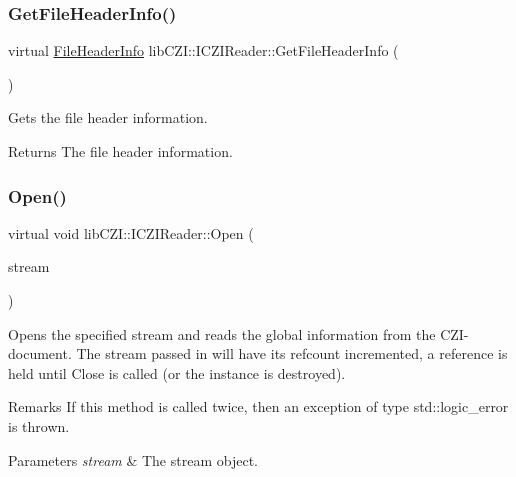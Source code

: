 \subsubsection{\texorpdfstring{Get\+File\+Header\+Info()}{GetFileHeaderInfo()}}
{\footnotesize\ttfamily virtual \hyperlink{structlib_c_z_i_1_1_file_header_info}{File\+Header\+Info} lib\+C\+Z\+I\+::\+I\+C\+Z\+I\+Reader\+::\+Get\+File\+Header\+Info (\begin{DoxyParamCaption}{ }\end{DoxyParamCaption})\hspace{0.3cm}{\ttfamily [pure virtual]}}

Gets the file header information. \begin{DoxyReturn}{Returns}
The file header information. 
\end{DoxyReturn}
\mbox{\label{classlib_c_z_i_1_1_i_c_z_i_reader_ae3b1a8fabae6b70480f0855fe374ecd9}} 
\subsubsection{\texorpdfstring{Open()}{Open()}}
{\footnotesize\ttfamily virtual void lib\+C\+Z\+I\+::\+I\+C\+Z\+I\+Reader\+::\+Open (\begin{DoxyParamCaption}\item[{std\+::shared\+\_\+ptr$<$ \hyperlink{classlib_c_z_i_1_1_i_stream}{I\+Stream} $>$}]{stream }\end{DoxyParamCaption})\hspace{0.3cm}{\ttfamily [pure virtual]}}

Opens the specified stream and reads the global information from the C\+Z\+I-\/document. The stream passed in will have its refcount incremented, a reference is held until Close is called (or the instance is destroyed). \begin{DoxyRemark}{Remarks}
If this method is called twice, then an exception of type std\+::logic\+\_\+error is thrown.
\end{DoxyRemark}

\begin{DoxyParams}{Parameters}
{\em stream} & The stream object. \\
\hline
\end{DoxyParams}
\mbox{\label{classlib_c_z_i_1_1_i_c_z_i_reader_a9dbab9ddaa7ae4bcfce3c64ed5eea82d}} 
